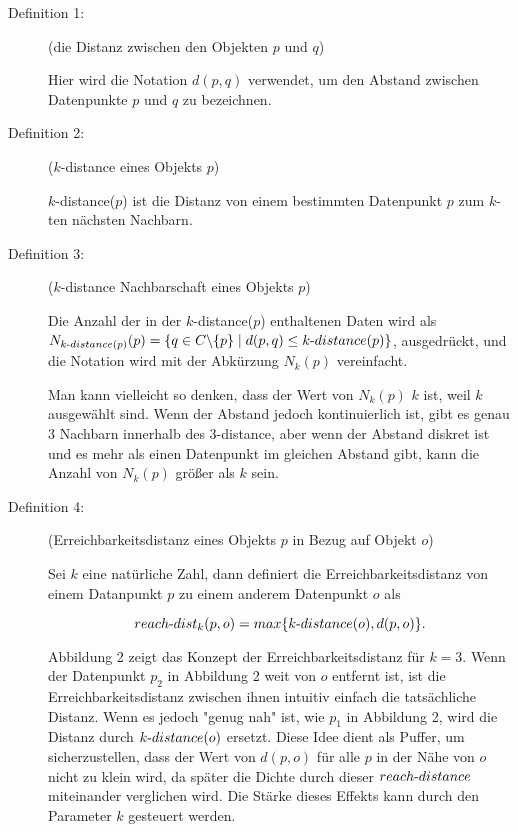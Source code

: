                 \begin{description}
                    \item[Definition 1:]{(die Distanz zwischen den Objekten $p$ und $q$)
                    
                        Hier wird die Notation $d(p, q)$ verwendet, um den Abstand zwischen Datenpunkte $p$ und $q$ zu bezeichnen.
                    }
                    
                    \item[Definition 2:]{($k$-distance eines Objekts $p$)
                    
                        $k$-distance($p$) ist die Distanz von einem bestimmten Datenpunkt $p$ zum $k$-ten nächsten Nachbarn.
                    }
                    
                    \item[Definition 3:]{($k$-distance Nachbarschaft eines Objekts $p$)
                    
                        Die Anzahl der in der $k$-distance($p$) enthaltenen Daten wird als $N_{k\text-distance(p)}(p)=\{q\in C \backslash \{p\}\mid d(p, q)\leq k\text-distance(p)\}$, ausgedrückt, und die Notation wird mit der Abkürzung $N_k(p)$ vereinfacht.
    
                        Man kann vielleicht so denken, dass der Wert von $N_k(p)$ $k$ ist, weil $k$ ausgewählt sind. Wenn der Abstand jedoch kontinuierlich ist, gibt es genau $3$ Nachbarn innerhalb des $3$-distance, aber wenn der Abstand diskret ist und es mehr als einen Datenpunkt im gleichen Abstand gibt, kann die Anzahl von $N_k(p)$ größer als $k$ sein.
                    }
                    
                    \item[Definition 4:]{(Erreichbarkeitsdistanz eines Objekts $p$ in Bezug auf Objekt $o$)
                    
                    Sei $k$ eine natürliche Zahl, dann definiert die Erreichbarkeitsdistanz von einem Datanpunkt $p$ zu einem anderem Datenpunkt $o$ als

                    \begin{equation}
                        \label{eqn:SSE}
                        reach \text-dist_k(p, o)=max\{k\text - distance(o), d(p, o)\}.
                    \end{equation}
                    
                    Abbildung 2 zeigt das Konzept der Erreichbarkeitsdistanz für $k = 3$. Wenn der Datenpunkt $p_2$ in Abbildung 2 weit von $o$ entfernt ist, ist die Erreichbarkeitsdistanz zwischen ihnen intuitiv einfach die tatsächliche Distanz. Wenn es jedoch "genug nah" ist, wie $p_1$ in Abbildung 2, wird die Distanz durch $k\text - distance(o)$ ersetzt. Diese Idee dient als Puffer, um sicherzustellen, dass der Wert von $d(p, o)$ für alle $p$ in der Nähe von $o$ nicht zu klein wird, da später die Dichte durch dieser $reach \text - distance$ miteinander verglichen wird. Die Stärke dieses Effekts kann durch den Parameter $k$ gesteuert werden.
                    }
                    

\end{description}
